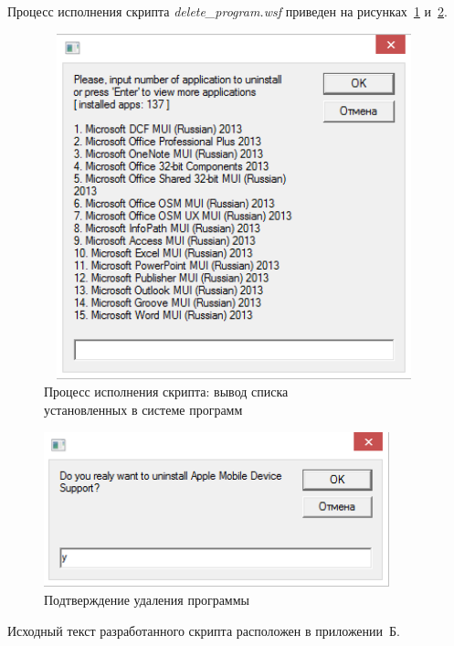 Процесс исполнения скрипта \textit{delete\_program.wsf} приведен на
рисунках~\ref{fig:process} и~\ref{fig:delete_confirmation}.

\begin{figure}[htbp]
  \centering
  \includegraphics[width=110mm,height=100mm]{img/process}
  \caption{Процесс исполнения скрипта: вывод списка \\
   установленных в системе программ}
  \label{fig:process}
\end{figure}

\vspace{-0.3\baselineskip}

\begin{figure}[htbp]
  \centering
  \includegraphics[width=100mm,height=45mm]{img/delete_confirmation}
  \caption{Подтверждение удаления программы}
  \label{fig:delete_confirmation}
\end{figure}

\vspace{-0.3\baselineskip}

Исходный текст разработанного скрипта расположен в приложении~Б.

\newpage
